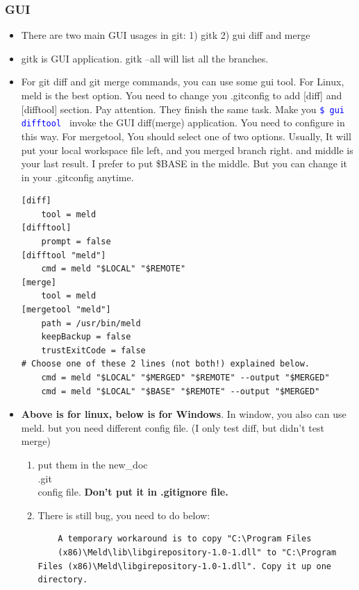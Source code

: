 \documentclass[a4paper,11pt,twoside]{book}
\newcommand{\linuxcommand}[1]{\texttt{\textcolor{blue}{\$ #1 \Pisymbol{psy}{191}}}}
\begin{document}
\subsubsection{GUI}
\begin{itemize}
	\item There are two main GUI usages in git: 1) gitk 2) gui diff and merge    

    \item gitk is GUI application. gitk --all will list all the branches.

    \item For git diff and git merge commands, you can use some gui tool. For Linux, meld is the best option. You need to change you .gitconfig to add [diff] and [difftool] section. Pay attention. They finish the same task. Make you \linuxcommand{gui difftool} invoke the GUI diff(merge) application. You need to configure in this way. For mergetool, You should select one of two options. Usually, It will put your local workspace file left, and you merged branch right. and middle is your last result. I prefer to put \$BASE in the middle. But you can change it in your .gitconfig anytime. 
\begin{verbatim}
[diff]
    tool = meld
[difftool]
	prompt = false
[difftool "meld"]
	cmd = meld "$LOCAL" "$REMOTE"
[merge]
    tool = meld
[mergetool "meld"]
	path = /usr/bin/meld
	keepBackup = false
	trustExitCode = false	
# Choose one of these 2 lines (not both!) explained below.
	cmd = meld "$LOCAL" "$MERGED" "$REMOTE" --output "$MERGED"
    cmd = meld "$LOCAL" "$BASE" "$REMOTE" --output "$MERGED"
\end{verbatim}

\item \textbf{Above is for linux, below is for Windows}. In window, you also can use meld. but you need different config file. (I only test diff, but didn't test merge)
\begin{enumerate}
	\item put them in the new\_doc\\.git\\config file. \textbf{Don't put it in .gitignore file.}
	\item There is still bug, you need to do below:
	\begin{verbatim}       
	A temporary workaround is to copy "C:\Program Files
	(x86)\Meld\lib\libgirepository-1.0-1.dll" to "C:\Program Files (x86)\Meld\libgirepository-1.0-1.dll". Copy it up one directory.
\end{verbatim}


\end{enumerate}
\end{itemize}
\end{document}
